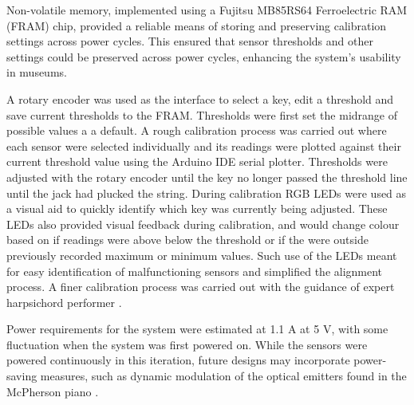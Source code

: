 Non-volatile memory, implemented using a Fujitsu MB85RS64 Ferroelectric RAM (FRAM) chip, provided a reliable means of storing and preserving calibration settings across power cycles. This ensured that sensor thresholds and other settings could be preserved across power cycles, enhancing the system's usability in museums.  

A rotary encoder was used as the interface to select a key, edit a threshold and save current thresholds to the FRAM.
Thresholds were first set the midrange of possible values a a default. A rough calibration process was carried out where each sensor were selected individually and its readings were plotted against their current threshold value using the Arduino IDE serial plotter. Thresholds were adjusted with the rotary encoder until the key no longer passed the threshold line until the jack had plucked the string. During calibration RGB LEDs were used as a visual aid to quickly identify which key was currently being adjusted. These LEDs also provided visual feedback during calibration, and would change colour based on if readings were above below the threshold or if the were outside previously recorded maximum or minimum values. Such use of the LEDs meant for easy identification of malfunctioning sensors and simplified the alignment process. A finer calibration process was carried out with the guidance of expert harpsichord performer .

Power requirements for the system were estimated at 1.1 A at 5 V, with some fluctuation when the system was first powered on. While the sensors were powered continuously in this iteration, future designs may incorporate power-saving measures, such as dynamic modulation of the optical emitters found in the McPherson piano \cite{McPherson2013}.

